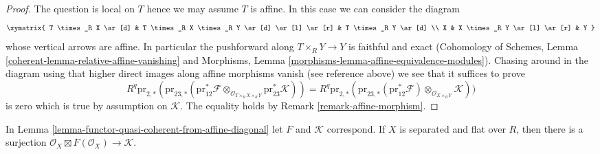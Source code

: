 \begin{proof}
The question is local on $T$ hence we may assume $T$ is affine.
In this case we can consider the diagram
$$
\xymatrix{
T \times_R X \ar[d] &
T \times_R X \times_R Y \ar[d] \ar[l] \ar[r] &
T \times_R Y \ar[d] \\
X &
X \times_R Y \ar[l] \ar[r] &
Y
}
$$
whose vertical arrows are affine. In particular the pushforward along
$T \times_R Y \to Y$ is faithful and exact (Cohomology of Schemes,
Lemma \ref{coherent-lemma-relative-affine-vanishing} and
Morphisms, Lemma \ref{morphisms-lemma-affine-equivalence-modules}).
Chasing around in the diagram using that higher direct images along
affine morphisms vanish (see reference above) we see that
it suffices to prove
$$
R^q\text{pr}_{2, *}(
\text{pr}_{23, *}(\text{pr}_{12}^*\mathcal{F}
\otimes_{\mathcal{O}_{T \times_R X \times_R Y}}
\text{pr}_{23}^*\mathcal{K})) =
R^q\text{pr}_{2, *}(
\text{pr}_{23, *}(\text{pr}_{12}^*\mathcal{F})
\otimes_{\mathcal{O}_{X \times_R Y}}
\mathcal{K}))
$$
is zero which is true by assumption on $\mathcal{K}$.
The equality holds by Remark \ref{remark-affine-morphism}.
\end{proof}

\begin{lemma}
\label{lemma-functor-quasi-coherent-from-separated}
In Lemma \ref{lemma-functor-quasi-coherent-from-affine-diagonal}
let $F$ and $\mathcal{K}$ correspond. If $X$ is separated and
flat over $R$, then there is a surjection
$\mathcal{O}_X \boxtimes F(\mathcal{O}_X) \to \mathcal{K}$.
\end{lemma}

